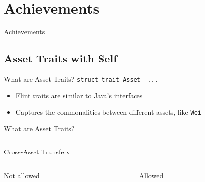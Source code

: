 \documentclass[aspectratio=169]{beamer}
\newcommand{\sectionslide}[1]{%
  \section{#1}
  \begin{frame}
  \begin{center}
    \vbox{}
    {\LARGE \usebeamercolor[fg]{title} #1}
    \par
  \end{center}
  \end{frame}
}
\begin{document}
\sectionslide{Achievements}

\subsection{Asset Traits with Self}

\begin{frame}{What are Asset Traits?}
\centering\texttt{struct trait Asset { ... }}
\\

\begin{itemize}
    \item Flint traits are similar to Java's interfaces
    \item Captures the commonalities between different assets, like {\tt Wei}
\end{itemize}

\end{frame}

\begin{frame}{What are Asset Traits?}
\centering
\inputminted{swift}{code/asset-transfer-function.flint}
\end{frame}


\begin{frame}{Cross-Asset Transfers}

\begin{columns}
\begin{column}{0.5\textwidth}
  \begin{block}{Not allowed}
    \inputminted{swift}{code/ca-not-allowed.flint}
  \end{block}
\end{column}
\begin{column}{0.5\textwidth}
  \begin{block}{Allowed}
    \inputminted{swift}{code/ca-allowed.flint}
  \end{block}
\end{column}
\end{columns}

\end{frame}
\end{document}
